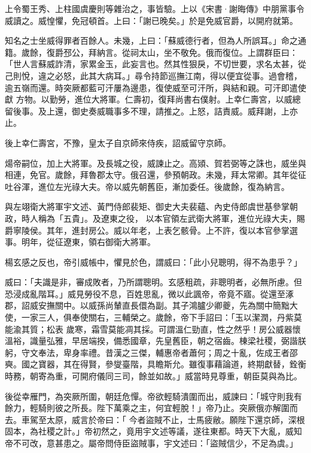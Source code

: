 \begin{pinyinscope}
 上令蜀王秀、上柱國虞慶則等雜治之，事皆驗。上以《宋書·謝晦傳》中朋黨事令威讀之。威惶懼，免冠頓首。上曰：「謝已晚矣。」於是免威官爵，以開府就第。



 知名之士坐威得罪者百餘人。未幾，上曰：「蘇威德行者，但為人所誤耳。」命之通籍。歲餘，復爵邳公，拜納言。從祠太山，坐不敬免。俄而復位。上謂群臣曰：「世人言蘇威詐清，家累金玉，此妄言也。然其性狠戾，不切世要，求名太甚，從己則悅，違之必怒，此其大病耳。」尋令持節巡撫江南，得以便宜從事。過會稽，逾五嶺而還。時突厥都藍可汗屢為邊患，復使威至可汗所，與結和親。可汗即遣使獻
 方物。以勤勞，進位大將軍。仁壽初，復拜尚書右僕射。上幸仁壽宮，以威總留後事。及上還，御史奏威職事多不理，請推之。上怒，詰責威。威拜謝，上亦止。



 後上幸仁壽宮，不豫，皇太子自京師來侍疾，詔威留守京師。



 煬帝嗣位，加上大將軍。及長城之役，威諫止之。高熲、賀若弼等之誅也，威坐與相連，免官。歲餘，拜魯郡太守。俄召還，參預朝政。未幾，拜太常卿。其年從征吐谷渾，進位左光祿大夫。帝以威先朝舊臣，漸加委任。後歲餘，復為納言。



 與左翊衛大將軍宇文述、黃門侍郎裴矩、御史大夫裴蘊、內史侍郎虞世基參掌朝政，時人稱為「五貴」。及遼東之役，
 以本官領左武衛大將軍，進位光祿大夫，賜爵寧陵侯。其年，進封房公。威以年老，上表乞骸骨。上不許，復以本官參掌選事。明年，從征遼東，領右御衛大將軍。



 楊玄感之反也，帝引威帳中，懼見於色，謂威曰：「此小兒聰明，得不為患乎？」



 威曰：「夫識是非，審成敗者，乃所謂聰明。玄感粗疏，非聰明者，必無所慮。但恐浸成亂階耳。」威見勞役不息，百姓思亂，微以此諷帝，帝竟不寤。從還至涿郡，詔威安撫關中。以威孫尚輦直長儇為副。其子鴻臚少卿夔，先為關中簡黜大使，一家三人，俱奉使關右，三輔榮之。歲餘，帝下手詔曰：「玉以潔潤，丹紫莫能渝其質；松表
 歲寒，霜雪莫能凋其採。可謂溫仁勁直，性之然乎！房公威器懷溫裕，識量弘雅，早居端揆，備悉國章，先皇舊臣，朝之宿齒。棟梁社稷，弼諧朕躬，守文奉法，卑身率禮。昔漢之三傑，輔惠帝者蕭何；周之十亂，佐成王者邵奭。國之寶器，其在得賢，參燮臺階，具瞻斯允。雖復事藉論道，終期獻替，銓衡時務，朝寄為重，可開府儀同三司，餘並如故。」威當時見尊重，朝臣莫與為比。



 後從幸雁門，為突厥所圍，朝廷危憚。帝欲輕騎潰圍而出，威諫曰：「城守則我有餘力，輕騎則彼之所長。陛下萬乘之主，何宜輕脫！」帝乃止。突厥俄亦解圍而去。車駕至太原，威言於帝曰：「
 今者盜賊不止，士馬疲敝。願陛下還京師，深根固本，為社稷之計。」帝初然之，竟用宇文述等議，遂往東都。時天下大亂，威知帝不可改，意甚患之。屬帝問侍臣盜賊事，宇文述曰：「盜賊信少，不足為虞。」




\end{pinyinscope}
